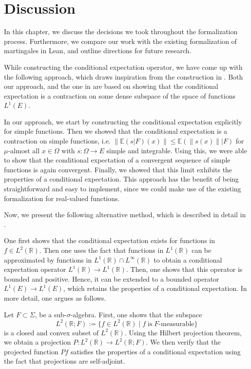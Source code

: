 
\chapter{Discussion}\label{chapter:discussion}

In this chapter, we discuss the decisions we took throughout the formalization process. Furthermore, we compare our work with the existing formalization of martingales in Lean, and outline directions for future research.

While constructing the conditional expectation operator, we have come up with the following approach, which draws inspiration from the construction in \cite{Hytoenen_2016}. Both our approach, and the one in \cite{Hytoenen_2016} are based on showing that the conditional expectation is a contraction on some dense subspace of the space of functions $L^1(E)$.

In our approach, we start by constructing the conditional expectation explicitly for simple functions. Then we showed that the conditional expectation is a contraction on simple functions, i.e. $\lVert \mathbb{E}(s \vert F)(x) \rVert \le \mathbb{E}(\lVert s(x) \rVert \vert F)$ for $\mu$-almost all $x \in \Omega$ with $s : \Omega \rightarrow E$ simple and integrable. Using this, we were able to show that the conditional expectation of a convergent sequence of simple functions is again convergent. Finally, we showed that this limit exhibits the properties of a conditional expectation. This approach has the benefit of being straightforward and easy to implement, since we could make use of the existing formalization for real-valued functions. 

Now, we present the following alternative method, which is described in detail in \cite{Hytoenen_2016}.

One first shows that the conditional expectation exists for functions in $f \in L^2(\mathbb{R})$. Then one uses the fact that functions in $L^1(\mathbb{R})$ can be approximated by functions in $L^1(\mathbb{R}) \cap L^\infty(\mathbb{R})$ to obtain a conditional expectation operator $L^1(\mathbb{R})\rightarrow L^1(\mathbb{R})$. Then, one shows that this operator is bounded and positive. Hence, it can be extended to a bounded operator $L^1(E)\rightarrow L^1(E)$, which retains the properties of a conditional expectation. In more detail, one argues as follows. 

Let $F \subset \Sigma$, be a sub-$\sigma$-algebra. First, one shows that the subspace 
\[
	L^2(\mathbb{R}; F) := \{f \in L^2(\mathbb{R}) \;\vert\; f \; \textrm{is} \; F\textrm{-measurable}\}
\] is a closed and convex subset of $L^2(\mathbb{R})$. Using the Hilbert projection theorem, we obtain a projection $P : L^2(\mathbb{R}) \rightarrow L^2(\mathbb{R}; F)$. We then verify that the projected function $Pf$ satisfies the properties of a conditional expectation using the fact that projections are self-adjoint. 

